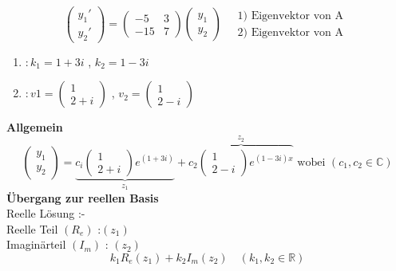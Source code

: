 \begin{example}
\[
 \begin{pmatrix}
y_1'\\
y_2'
\end{pmatrix} =\begin{pmatrix}
-5 & 3 \\
-15 & 7 
\end{pmatrix}\begin{pmatrix}
y_1\\
y_2
\end{pmatrix} \quad \begin{matrix}
1 ) \text{ Eigenvektor von A } \\
2 ) \text{ Eigenvektor von A }
\end{matrix}\]
\begin{enumerate}
\item  $ : k_1 = 1 + 3i$ , $ k_2 = 1 - 3i $
\item  $ : v1 = 
\begin{pmatrix}
1\\
2 + i 
\end{pmatrix}$ , $ v_2 = \begin{pmatrix}
1\\
2 - i
\end{pmatrix} $   
\end{enumerate}
\textbf{Allgemein}\\
\[ \begin{pmatrix}
y_1\\
y_2
\end{pmatrix} = \underbrace{c_i \begin{pmatrix}
1\\
2 + i
\end{pmatrix}e^{(1+3i)}}_{z_1} + \overbrace{c_2 \begin{pmatrix}
1\\
2 - i
\end{pmatrix} e^{(1-3i)x}}^{z_2} \text{ wobei } (c_1 , c_2  \in \mathbb{C})  \]
\textbf{Übergang zur reellen Basis}\\
Reelle Lösung :-\\
Reelle Teil $(R_e)$ :$(z_1)$\\
Imaginärteil $(I_m)$ : $(z_2)$\\
\[ k_1 R_e(z_1) + k_2 I_m(z_2) \quad (k_1 , k_2 \in \mathbb{R})  \]
\end{example}


